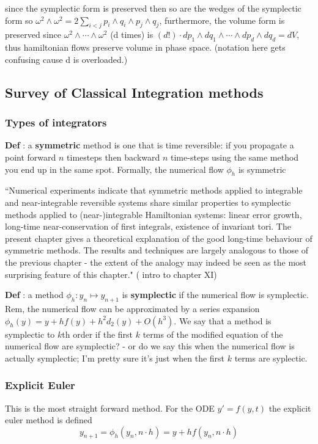\documentclass[12pt]{article}
\begin{document}
since the symplectic form is preserved then so are the wedges of the symplectic form so $\omega^2\wedge\omega^2 = 2\sum_{i<j}p_i\wedge q_i\wedge p_j\wedge q_j$, furthermore, the volume form is preserved since $\omega^2\wedge \cdots \wedge \omega^2$ (d times) is $(d!) \cdot dp_1\wedge dq_1\wedge \cdots \wedge dp_d\wedge dq_d = dV$, thus hamiltonian flows preserve volume in phase space. (notation here gets confusing cause d is overloaded.) 


\subsection{Survey of Classical Integration methods}
\subsubsection{Types of integrators}

\textbf{Def} : a \textbf{symmetric} method is one that is time reversible: if you propagate a point forward $n$ timesteps then backward $n$ time-steps using the same method you end up in the same spot. Formally, the numerical flow $\phi_h$ is symmetric  

``Numerical experiments indicate that symmetric methods applied to integrable and near-integrable reversible systems share similar properties to symplectic methods applied to (near-)integrable Hamiltonian systems: linear error growth, long-time near-conservation of first integrals, existence of invariant tori. The present chapter gives a theoretical explanation of the good long-time behaviour of symmetric methods. The results and techniques are largely analogous to those of the previous chapter - the extent of the analogy may indeed be seen as the most surprising feature of this chapter." (\cite{Numerical} intro to chapter XI)

\textbf{Def} : a method $\phi_h : y_n\mapsto y_{n+1}$ is \textbf{symplectic} if the numerical flow is symplectic. Rem, the numerical flow can be approximated by a series expansion $\phi_h(y) = y + hf(y) + h^2d_2(y) + O(h^3)$. We say that a method is symplectic to $k$th order if the first $k$ terms of the modified equation of the numerical flow are symplectic? - or do we say this when the numerical flow is actually symplectic; I'm pretty sure it's just when the first $k$ terms are syplectic. 

\subsubsection{Explicit Euler}
This is the most straight forward method. For the ODE $y' = f(y,t)$ the explicit euler method is defined
\begin{equation}\label{eq:explicit euler}
y_{n+1} = \phi_h(y_n , n\cdot h) = y + h f(y_n, n\cdot h)
\end{equation}
\end{document}
